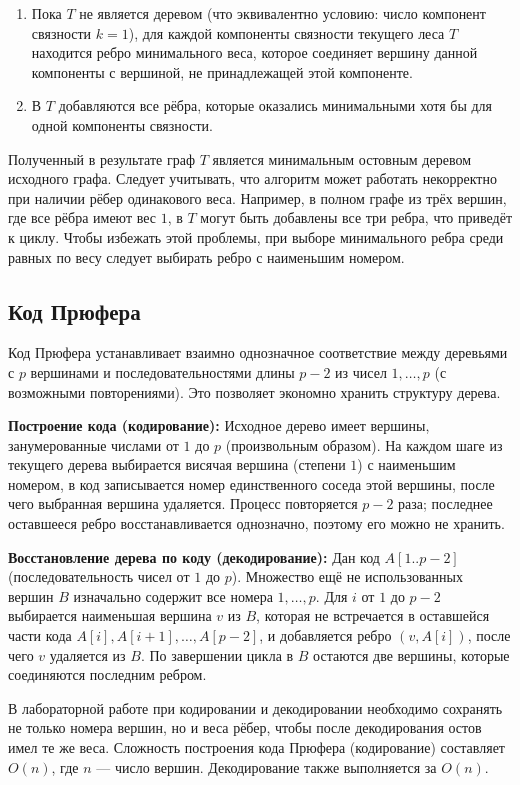 \begin{enumerate}
	\item Пока \(T\) не является деревом (что эквивалентно условию: число компонент связности $k = 1$), для каждой компоненты связности текущего леса \(T\) находится ребро минимального веса, которое соединяет вершину данной компоненты с вершиной, не принадлежащей этой компоненте.
	\item В \(T\) добавляются все рёбра, которые оказались минимальными хотя бы для одной компоненты связности.
\end{enumerate}

Полученный в результате граф \(T\) является минимальным остовным деревом исходного графа. Следует учитывать, что алгоритм может работать некорректно при наличии рёбер одинакового веса. Например, в полном графе из трёх вершин, где все рёбра имеют вес \(1\), в \(T\) могут быть добавлены все три ребра, что приведёт к циклу. Чтобы избежать этой проблемы, при выборе минимального ребра среди равных по весу следует выбирать ребро с наименьшим номером.

\subsection{Код Прюфера}
Код Прюфера устанавливает взаимно однозначное соответствие между деревьями с $p$ вершинами и последовательностями длины $p-2$ из чисел $1,\dots,p$ (с возможными повторениями). Это позволяет экономно хранить структуру дерева.

\textbf{Построение кода (кодирование):}
Исходное дерево имеет вершины, занумерованные числами от $1$ до $p$ (произвольным образом). На каждом шаге из текущего дерева выбирается висячая вершина (степени $1$) с наименьшим номером, в код записывается номер единственного соседа этой вершины, после чего выбранная вершина удаляется. Процесс повторяется $p-2$ раза; последнее оставшееся ребро восстанавливается однозначно, поэтому его можно не хранить.

\textbf{Восстановление дерева по коду (декодирование):}
Дан код $A[1..p-2]$ (последовательность чисел от $1$ до $p$). Множество ещё не использованных вершин $B$ изначально содержит все номера $1,\dots,p$. Для $i$ от $1$ до $p-2$ выбирается наименьшая вершина $v$ из $B$, которая не встречается в оставшейся части кода $A[i], A[i+1], \dots, A[p-2]$, и добавляется ребро $(v, A[i])$, после чего $v$ удаляется из $B$. По завершении цикла в $B$ остаются две вершины, которые соединяются последним ребром.

В лабораторной работе при кодировании и декодировании необходимо сохранять не только номера вершин, но и веса рёбер, чтобы после декодирования остов имел те же веса. Сложность построения кода Прюфера (кодирование) составляет $O(n)$, где $n$ — число вершин. Декодирование также выполняется за $O(n)$.

